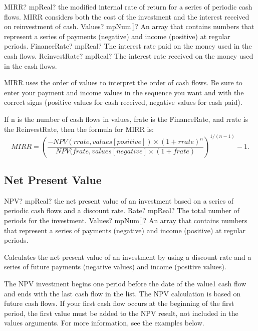 \begin{mpFunctionsExtract}
	\mpWorksheetFunctionThreeNotImplemented
	{MIRR? mpReal? the modified internal rate of return for a series of periodic cash flows. MIRR considers both the cost of the investment and the interest received on reinvestment of cash.}
	{Values? mpNum[]? An array that contains numbers that represent a series of payments (negative) and income (positive) at regular periods.}
	{FinanceRate? mpReal? The interest rate paid on the money used in the cash flows.}
	{ReinvestRate? mpReal? The interest rate received on the money used in the cash flows.}
\end{mpFunctionsExtract}

\vspace{0.3cm}
MIRR uses the order of values to interpret the order of cash flows. Be sure to enter your payment and income values in the sequence you want and with the correct signs (positive values for cash received, negative values for cash paid).

If n is the number of cash flows in values, frate is the FinanceRate, and rrate is the ReinvestRate, then the formula for MIRR is: 
\begin{equation}
MIRR=\left(\frac{-NPV(rrate,values[positive]) \times(1+rrate)^n}{NPV(frate,values[negative] \times(1+frate)}  \right)^{1/(n-1)} - 1. 
\end{equation}



\subsection{Net Present Value}

\begin{mpFunctionsExtract}
	\mpWorksheetFunctionTwoNotImplemented
	{NPV? mpReal? the net present value of an investment based on a series of periodic cash flows and a discount rate.}
	{Rate? mpReal? The total number of periods for the investment.}
	{Values? mpNum[]? An array that contains numbers that represent a series of payments (negative) and income (positive) at regular periods.}
\end{mpFunctionsExtract}


\vspace{0.3cm}
Calculates the net present value of an investment by using a discount rate and a series of future payments (negative values) and income (positive values).

The NPV investment begins one period before the date of the value1 cash flow and ends with the last cash flow in the list. The NPV calculation is based on future cash flows. If your first cash flow occurs at the beginning of the first period, the first value must be added to the NPV result, not included in the values arguments. For more information, see the examples below.

